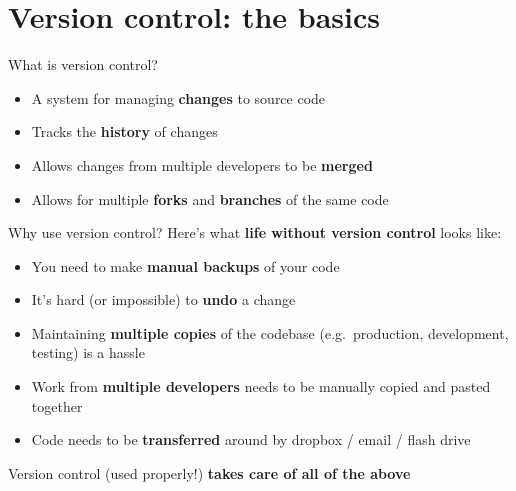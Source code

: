 \part{Version control: the basics}
\frame{\partpage}

\begin{frame}{What is version control?}
    \begin{itemize}
        \item A system for managing \textbf{changes} to source code
        \item Tracks the \textbf{history} of changes
        \item Allows changes from multiple developers to be \textbf{merged}
        \item Allows for multiple \textbf{forks} and \textbf{branches} of the same code
    \end{itemize}
\end{frame}

\begin{frame}{Why use version control?}
    Here's what \textbf{life without version control} looks like:
    \begin{itemize}
        \item You need to make \textbf{manual backups} of your code
        \item It's hard (or impossible) to \textbf{undo} a change
        \item Maintaining \textbf{multiple copies} of the codebase (e.g.\ production, development, testing)
            is a hassle
        \item Work from \textbf{multiple developers} needs to be manually copied and pasted together
        \item Code needs to be \textbf{transferred} around by dropbox / email / flash drive
    \end{itemize}
    Version control (used properly!) \textbf{takes care of all of the above}
\end{frame}


